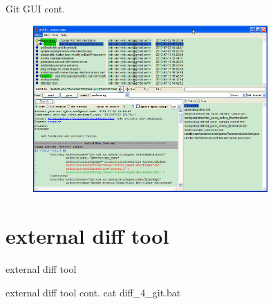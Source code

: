 ﻿\documentclass{beamer}
\begin{document}
\begin{frame}{Git GUI cont.}
\begin{figure}
  \centering
  \includegraphics[width=0.8\textwidth]{picturedir/gitk.png}%
\end{figure}
\end{frame}

\section[external diff tool]{external diff tool}
\begin{frame}{external diff tool}
\end{frame}

\begin{frame}{external diff tool cont.}
  \textcolor{blue!50}{\ttfamily cat diff\_4\_git.bat}
  
\end{frame}
\end{document}
